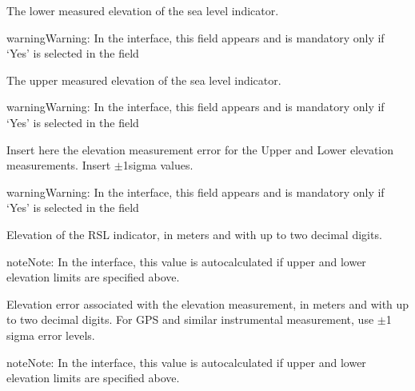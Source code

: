\documentclass[letterpaper,10pt,english]{sphinxmanual}
\begin{document}
 \sphinxhyphen{} The lower measured elevation of the sea level indicator.

\begin{sphinxadmonition}{warning}{Warning:}
In the interface, this field appears and is mandatory only if ‘Yes’ is selected in the field 
\end{sphinxadmonition}

 \sphinxhyphen{} The upper measured elevation of the sea level indicator.

\begin{sphinxadmonition}{warning}{Warning:}
In the interface, this field appears and is mandatory only if ‘Yes’ is selected in the field 
\end{sphinxadmonition}

 \sphinxhyphen{} Insert here the elevation measurement error for the Upper and Lower elevation measurements. Insert \(\pm\)1\sphinxhyphen{}sigma values.

\begin{sphinxadmonition}{warning}{Warning:}
In the interface, this field appears and is mandatory only if ‘Yes’ is selected in the field 
\end{sphinxadmonition}

 \sphinxhyphen{} Elevation of the RSL indicator, in meters and with up to two decimal digits.

\begin{sphinxadmonition}{note}{Note:}
In the interface, this value is auto\sphinxhyphen{}calculated if upper and lower elevation limits are specified above.
\end{sphinxadmonition}

 \sphinxhyphen{} Elevation error associated with the elevation measurement, in meters and with up to two decimal digits. For GPS and similar instrumental measurement, use \(\pm\)1 sigma error levels.

\begin{sphinxadmonition}{note}{Note:}
In the interface, this value is auto\sphinxhyphen{}calculated if upper and lower elevation limits are specified above.
\end{sphinxadmonition}
\end{document}
